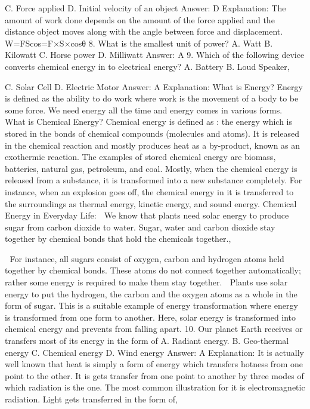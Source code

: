 C. Force applied
D. Initial velocity of an object
Answer: D
Explanation: The amount of work done depends on the amount of the
force applied and the distance object moves along with the angle
between force and displacement.
W=F\times S\times cos\theta=F×S×cosθ
8. What is the smallest unit of power?
A. Watt
B. Kilowatt
C. Horse power
D. Milliwatt
Answer: A
9. Which of the following device converts chemical energy in to
electrical energy?
A. Battery
B. Loud Speaker, 


C. Solar Cell
D. Electric Motor
Answer: A
Explanation:
What is Energy?
Energy is defined as the ability to do work where work is the
movement of a body to be some force. We need energy all the time
and energy comes in various forms.
What is Chemical Energy?
Chemical energy is defined as : the energy which is stored in the
bonds of chemical compounds (molecules and atoms).
It is released in the chemical reaction and mostly produces heat as a
by-product, known as an exothermic reaction. The examples of
stored chemical energy are biomass, batteries, natural gas,
petroleum, and coal. Mostly, when the chemical energy is released
from a substance, it is transformed into a new substance completely.
For instance, when an explosion goes off, the chemical energy in it is
transferred to the surroundings as thermal energy, kinetic energy,
and sound energy.
Chemical Energy in Everyday Life:
 We know that plants need solar energy to produce sugar from
carbon dioxide to water. Sugar, water and carbon dioxide stay
together by chemical bonds that hold the chemicals together., 


 For instance, all sugars consist of oxygen, carbon and hydrogen
atoms held together by chemical bonds. These atoms do not
connect together automatically; rather some energy is required
to make them stay together.
 Plants use solar energy to put the hydrogen, the carbon and
the oxygen atoms as a whole in the form of sugar. This is a
suitable example of energy transformation where energy is
transformed from one form to another. Here, solar energy is
transformed into chemical energy and prevents from falling
apart.
10. Our planet Earth receives or transfers most of its energy in
the form of
A. Radiant energy.
B. Geo-thermal energy
C. Chemical energy
D. Wind energy
Answer: A
Explanation: It is actually well known that heat is simply a form of
energy which transfers hotness from one point to the other. It is
gets transfer from one point to another by three modes of which
radiation is the one. The most common illustration for it is
electromagnetic radiation. Light gets transferred in the form of, 


